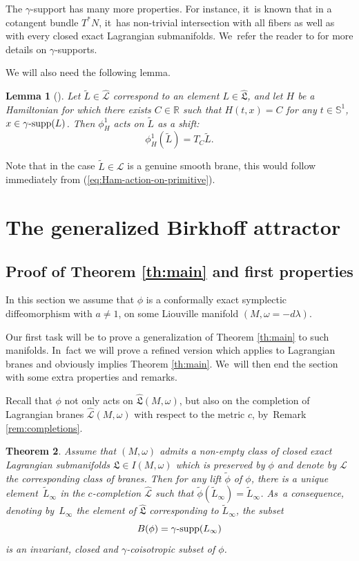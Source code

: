 \documentclass[JEP,XML,SOM,Unicode,NoFloatCountersInSection,published]{cedram}
\newtheorem{thm}{Theorem}[section]
\newtheorem{lem}[thm]{Lemma}
\theoremstyle{definition}
\newcommand {\LL}{{\mathcal L}}
\newcommand{\R}{\mathbb{R}}
\DeclareMathOperator{\gammasupp}{\gamma\textup{-supp}}
\newcommand{\fL}{\mathfrak {L}}
\newcommand{\hatL}{\widehat{\fL}}
\newcommand{\hatLL}{\widehat{\LL}}
\begin{document}
The $\gamma$\nobreakdash-support has many more properties. For instance, it~is known that in a cotangent bundle $T^*N$, it~has non-trivial intersection with all fibers as well as with every closed exact Lagrangian submanifolds. We~refer the reader to \cite{Viterbo-gammas} for more details on $\gamma$\nobreakdash-supports.

We will also need the following lemma.

\begin{lem}[{\cite[Lem.\,6.12]{Viterbo-gammas}}]\label{lem:shift-of brane} Let $\tilde L\in \hatLL$ correspond to an element $L\in\hatL$, and let $H$ be a Hamiltonian for which there exists $C\in\R$ such that $H(t,x)=C$ for any $t\in\mathbb{S}^1$, $x\in \gammasupp(L)$. Then $\phi_H^1$ acts on $\tilde L$ as a shift:\vspace*{-3pt}
\[
\phi_H^1(\tilde L)=T_C\tilde L.
\]
\end{lem}

Note that in the case $\tilde L\in\LL$ is a genuine smooth brane, this would follow immediately from (\ref{eq:Ham-action-on-primitive}).

\section{The generalized Birkhoff attractor}\label{Section-Birkhoff-attractor}

\subsection{Proof of Theorem \ref{th:main} and first properties}

In this section we assume that $\phi$ is a conformally exact symplectic diffeomorphism with $a\neq 1$, on some Liouville manifold $(M,\omega=-d\lambda)$.

Our first task will be to prove a generalization of Theorem \ref{th:main} to such manifolds. In~fact we will prove a refined version which applies to Lagrangian branes and obviously implies Theorem \ref{th:main}. We~will then end the section with some extra properties and remarks.

Recall that $\phi$ not only acts on $\hatL(M,\omega)$, but also on the completion of Lagrangian branes $\hatLL(M,\omega)$ with respect to the metric $c$, by~Remark \ref{rem:completions}.

\begin{thm}\label{th:main-for-branes}
Assume that $(M,\omega)$ admits a non-empty class of closed exact Lagrangian submanifolds $\fL\in I(M,\omega)$ which is preserved by $\phi$ and denote by $\LL$ the corresponding class of branes.
Then for any lift $\tilde\phi$ of $\phi$, there is a unique element~$\tilde L_\infty$ in the $c$-completion $\hatLL$
such that $\tilde\phi\left(\tilde L_\infty\right)=\tilde L_\infty$. As~a consequence, denoting by~$L_\infty$ the element of $\hatL$ corresponding to $\tilde L_\infty$,
the subset\vspace*{-3pt}
\[
B(\phi)=\gammasupp(L_\infty)
\]
is an invariant, closed and $\gamma$\nobreakdash-coisotropic subset of $\phi$.
\end{thm}
\end{document}
